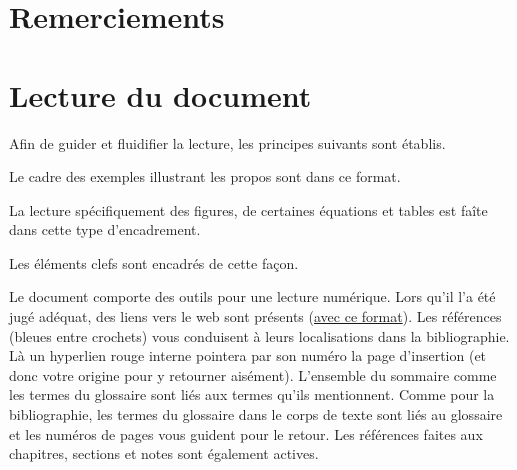 \documentclass[12pt,twoside,a4paper,english,french]{book} %
\newcommand{\figbox}[1] {
\begin{tcolorbox}[width=\linewidth, boxsep=2pt, left=2pt, right=2pt, top=2pt, breakable] #1 \end{tcolorbox}}
\newcommand{\exbox}[1] {
\begin{tcolorbox}[colframe=green!50!white, colback=green!10!white, width=\linewidth, boxsep=2pt, left=2pt, right=2pt, top=2pt, arc=3mm, breakable] #1 \end{tcolorbox}}
\newcommand{\keybox}[1]{\begin{tcolorbox}[colframe=red!50!white, width=\linewidth,boxsep=2pt, left=2pt, right=2pt, top=2pt, arc=-1mm, breakable] #1 \end{tcolorbox}}
\begin{document}
\section*{Remerciements}
%

\cleardoublepage

\tableofcontents
\label{TOC}
\section*{Lecture du document}

Afin de guider et fluidifier la lecture, les principes suivants sont établis.
\exbox{Le cadre des exemples illustrant les propos sont dans ce format.}
\figbox{La lecture spécifiquement des figures, de certaines équations et tables est faîte dans cette type d'encadrement.}
\keybox{Les éléments clefs sont encadrés de cette façon.}

Le document comporte des outils pour une lecture numérique.
Lors qu'il l'a été jugé adéquat, des liens vers le web sont présents (\href{https://duckduckgo.com}{avec ce format}).
Les références (bleues entre crochets) vous conduisent à leurs localisations dans la bibliographie.
Là un hyperlien rouge interne pointera par son numéro la page d'insertion (et donc votre origine pour y retourner aisément).
L'ensemble du sommaire comme les termes du glossaire sont liés aux termes qu'ils mentionnent.
Comme pour la bibliographie, les termes du glossaire dans le corps de texte sont liés au glossaire et les numéros de pages vous guident pour le retour.
Les références faites aux chapitres, sections et notes sont également actives.

\listoffigures
\newpage
\printglossaries
\end{document}
